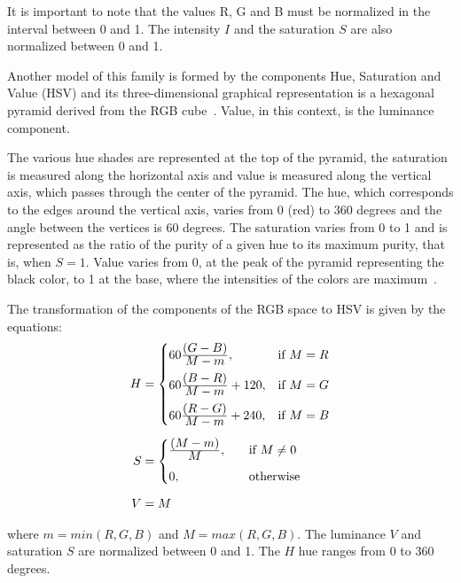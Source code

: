 It is important to note that the values R, G and B must be normalized in the interval between 0 and 1. The intensity $I$ and the saturation $S$ are also normalized between 0 and 1.

Another model of this family is formed by the components Hue, Saturation and Value (HSV) and its three-dimensional graphical representation is a hexagonal pyramid derived from the RGB cube~\citep{pedrini:08}. Value, in this context, is the luminance component.

The various hue shades are represented at the top of the pyramid, the saturation is measured along the horizontal axis and value is measured along the vertical axis, which passes through the center of the pyramid. The hue, which corresponds to the edges around the vertical axis, varies from 0 (red) to 360 degrees and the angle between the vertices is 60 degrees. The saturation varies from 0 to 1 and is represented as the ratio of the purity of a given hue to its maximum purity, that is, when $S = 1$. Value varies from 0, at the peak of the pyramid representing the black color, to 1 at the base, where the intensities of the colors are maximum~\citep{pedrini:08}.

The transformation of the components of the RGB space to HSV is given by the equations:
\begin{align}
\label{eq:rgb_para_hsv}
\begin{split}
  H &=  \begin{cases}
            60\frac{\displaystyle (G - B)}{\displaystyle M - m}, & \text{if}\ M = R\\[0.7em]
            60\frac{\displaystyle (B - R)}{\displaystyle M - m} + 120, & \text{if}\ M = G\\[0.7em]
            60\frac{\displaystyle (R - G)}{\displaystyle M - m} + 240, & \text{if}\ M = B
       \end{cases}
  \\[0.5em]
  S &=  \begin{cases}
            \frac{\displaystyle (M - m)}{\displaystyle M}, \quad &\text{if}\ M \neq 0\\[0.7em]
            0, \quad &\text{otherwise}\\
       \end{cases}
  \\[0.5em]
  V &= M
\end{split}
\end{align}

\noindent where $m = min(R, G ,B)$ and $M = max(R, G ,B)$. The luminance $V$ and saturation $S$ are normalized between 0 and 1. The $H$ hue ranges from 0 to 360 degrees.

